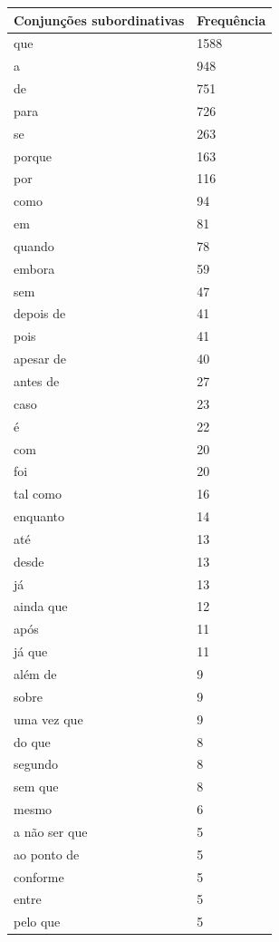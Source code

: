 \documentclass[output=paper,colorlinks,citecolor=brown]{langscibook}
\begin{document}
	\begin{longtable}{ | p{3cm} | p{2cm} | }
		\hline
		\textbf{Conjunções subordinativas} & \textbf{Frequência} \\\hline
		que & 1588\\\hline
		a & 948\\\hline
		de & 751\\\hline
		para & 726\\\hline
		se & 263\\\hline
		porque & 163\\\hline
		por & 116\\\hline
		como & 94\\\hline
		em & 81\\\hline
		quando & 78\\\hline
		embora & 59\\\hline
		sem & 47\\\hline
		depois de & 41\\\hline
		pois & 41\\\hline
		apesar de & 40\\\hline
		antes de & 27\\\hline
		caso & 23\\\hline
		é & 22\\\hline
		com & 20\\\hline
		foi & 20\\\hline
		tal como & 16\\\hline
		enquanto & 14\\\hline
		até & 13\\\hline
		desde & 13\\\hline
		já & 13\\\hline
		ainda que & 12\\\hline
		após & 11\\\hline
		já que & 11\\\hline
		além de & 9\\\hline
		sobre & 9\\\hline
		uma vez que & 9\\\hline
		do que & 8\\\hline
		segundo & 8\\\hline
		sem que & 8\\\hline
		mesmo & 6\\\hline
		a não ser que & 5\\\hline
		ao ponto de & 5\\\hline
		conforme & 5\\\hline
		entre & 5\\\hline
		pelo que & 5\\\hline

\end{longtable}
\end{document}
